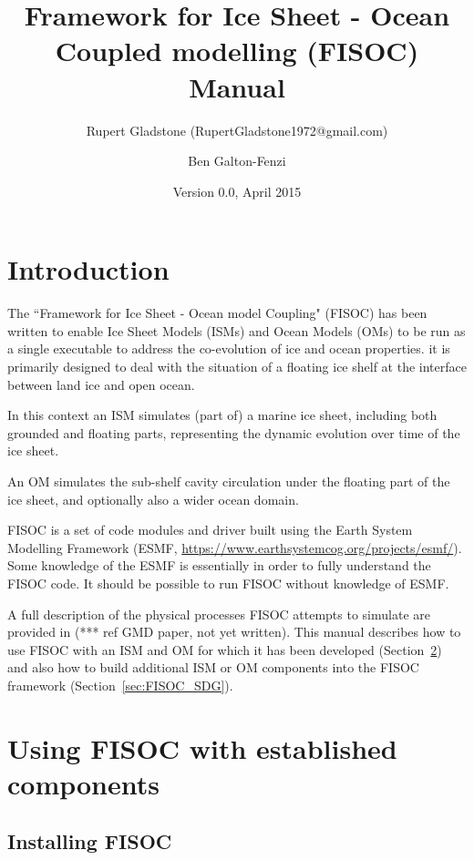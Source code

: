 \documentclass[12pt]{article}
\begin{document}
\title{Framework for Ice Sheet - Ocean Coupled modelling (FISOC) Manual}
\author{Rupert Gladstone (RupertGladstone1972@gmail.com) \and Ben Galton-Fenzi}
\date{Version 0.0, April 2015}
\maketitle


\section{Introduction}

The ``Framework for Ice Sheet - Ocean model Coupling" (FISOC) has been written to enable Ice Sheet Models 
(ISMs) and Ocean Models (OMs) to be run as a single executable to address the co-evolution of ice and ocean 
properties.  it is primarily designed to deal with the situation of a floating ice shelf at the interface 
between land ice and open ocean.

In this context an ISM simulates (part of) a marine ice sheet, including both grounded and floating parts, 
representing the dynamic evolution over time of the ice sheet.

An OM simulates the sub-shelf cavity circulation under the floating part of the ice sheet, and optionally also 
a wider ocean domain.

FISOC is a set of code modules and driver built using the Earth System Modelling Framework (ESMF, 
\url{https://www.earthsystemcog.org/projects/esmf/}). 
Some knowledge of the ESMF is essentially in order to fully understand the FISOC code.  It should 
be possible to run FISOC without knowledge of ESMF.

A full description of the physical processes FISOC attempts to simulate are provided in (***
ref GMD paper, not yet written).  
This manual describes how to use FISOC with an ISM and OM for which it has been 
developed (Section~\ref{sec:FISOC_SUG}) and also how to build additional ISM or OM components 
into the FISOC framework (Section~\ref{sec:FISOC_SDG}).




\section{Using FISOC with established components}
\label{sec:FISOC_SUG}

\subsection{Installing FISOC}
\end{document}
